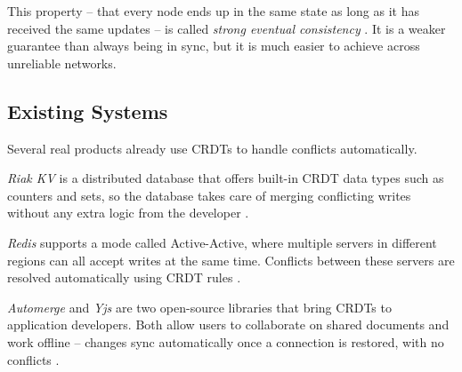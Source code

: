 This property -- that every node ends up in the same state as long as it has received the same updates --
is called \textit{strong eventual consistency} \cite{vogels2009eventually}. It is a weaker guarantee than
always being in sync, but it is much easier to achieve across unreliable networks.

\subsection{Existing Systems}

Several real products already use CRDTs to handle conflicts automatically.

\textit{Riak KV} is a distributed database that offers built-in CRDT data types such as counters and sets,
so the database takes care of merging conflicting writes without any extra logic from the developer
\cite{riak2024}.

\textit{Redis} supports a mode called Active-Active, where multiple servers in different regions can all
accept writes at the same time. Conflicts between these servers are resolved automatically using CRDT rules
\cite{redis2024}.

\textit{Automerge} and \textit{Yjs} are two open-source libraries that bring CRDTs to application
developers. Both allow users to collaborate on shared documents and work offline -- changes sync
automatically once a connection is restored, with no conflicts \cite{automerge2024, nicolaescu2015}.
